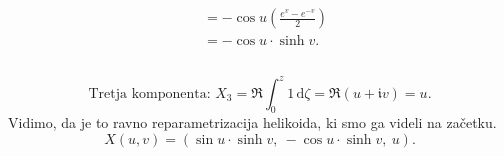 \documentclass[8pt]{beamer}
\theoremstyle{definition}
\theoremstyle{remark}
\theoremstyle{plain}
\numberwithin{equation}{section}  %
\begin{document}
\begin{frame}
\begin{columns}
\begin{column}{0.475\textwidth}
{{\begin{align*}
                      &= -\cos u \left(\frac{e^v - e^{-v}}{2}\right) \\
                      &= -\cos u \cdot \sinh v.
                \end{align*}
              }%
            }
        \end{column}
    \end{columns}
    \pause
    \begin{equation*}
        \text{Tretja komponenta: } X_3=\Re \int_0^z 1 \, \mathrm{d}\zeta = \Re \left(u + \mathfrak{i}v\right) = u.
    \end{equation*}
    \pause
    Vidimo, da je to ravno reparametrizacija helikoida, ki smo ga videli na začetku. 
    \begin{equation*}
        X(u, v) = \left( \sin u \cdot \sinh v,\ -\cos u \cdot \sinh v,\ u \right).
    \end{equation*}
    
\end{frame}
\end{document}
